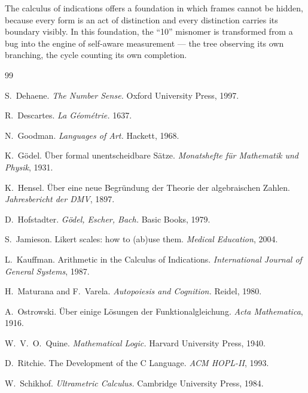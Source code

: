 \documentclass[12pt,a4paper]{article}
\theoremstyle{definition}
\theoremstyle{remark}
\begin{document}
The calculus of indications offers a foundation in which frames cannot be hidden,
because every form is an act of distinction and every distinction carries its
boundary visibly. In this foundation, the ``10'' misnomer is transformed from a bug
into the engine of self-aware measurement --- the tree observing its own branching,
the cycle counting its own completion.

\begin{thebibliography}{99}

S.~Dehaene.
\emph{The Number Sense.}
Oxford University Press, 1997.

R.~Descartes.
\emph{La G\'{e}om\'{e}trie.} 1637.

N.~Goodman.
\emph{Languages of Art.}
Hackett, 1968.

K.~G\"{o}del.
\"{U}ber formal unentscheidbare S\"{a}tze.
\emph{Monatshefte f\"{u}r Mathematik und Physik}, 1931.

K.~Hensel.
\"{U}ber eine neue Begr\"{u}ndung der Theorie der algebraischen Zahlen.
\emph{Jahresbericht der DMV}, 1897.

D.~Hofstadter.
\emph{G\"{o}del, Escher, Bach.}
Basic Books, 1979.

S.~Jamieson.
Likert scales: how to (ab)use them.
\emph{Medical Education}, 2004.

L.~Kauffman.
Arithmetic in the Calculus of Indications.
\emph{International Journal of General Systems}, 1987.

H.~Maturana and F.~Varela.
\emph{Autopoiesis and Cognition.}
Reidel, 1980.

A.~Ostrowski.
\"{U}ber einige L\"{o}sungen der Funktionalgleichung.
\emph{Acta Mathematica}, 1916.

W.~V.~O.~Quine.
\emph{Mathematical Logic.}
Harvard University Press, 1940.

D.~Ritchie.
The Development of the C Language.
\emph{ACM HOPL-II}, 1993.

W.~Schikhof.
\emph{Ultrametric Calculus.}
Cambridge University Press, 1984.


\end{thebibliography}
\end{document}
